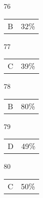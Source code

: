 \documentclass[12pt]{article}
\begin{document}
\begin{multicols}{5}
\begin{enumerate}
\item[]
\item[76] \begin{tabular}{cc} B & 32\%\end{tabular}
\item[77] \begin{tabular}{cc} C & 39\%\end{tabular}
\item[78] \begin{tabular}{cc} B & 80\%\end{tabular}
\item[79] \begin{tabular}{cc} D & 49\%\end{tabular}
\item[80] \begin{tabular}{cc} C & 50\%\end{tabular}

\item[]


\end{enumerate}
\end{multicols}
\end{document}
